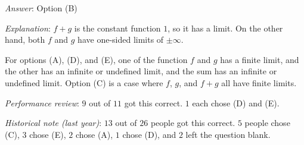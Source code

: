 \documentclass[10pt]{amsart}
\begin{document}
\begin{enumerate}
  {\em Answer}: Option (B)

  {\em Explanation}: $f + g$ is the constant function $1$, so it has a
  limit. On the other hand, both $f$ and $g$ have one-sided limits of
  $\pm \infty$.

  For options (A), (D), and (E), one of the function $f$ and $g$ has a
  finite limit, and the other has an infinite or undefined limit, and
  the sum has an infinite or undefined limit. Option (C) is a case
  where $f$, $g$, and $f + g$ all have finite limits.

  {\em Performance review}: $9$ out of $11$ got this correct. $1$ each
  chose (D) and (E).

  {\em Historical note (last year)}: $13$ out of $26$ people got this
  correct. $5$ people chose (C), $3$ chose (E), $2$ chose (A), $1$
  chose (D), and $2$ left the question blank.


\end{enumerate}
\end{document}
